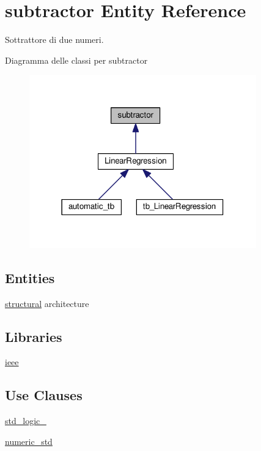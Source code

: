 \hypertarget{classsubtractor}{\section{subtractor Entity Reference}
\label{classsubtractor}
}


Sottrattore di due numeri.  




Diagramma delle classi per subtractor\nopagebreak
\begin{figure}[H]
\begin{center}
\leavevmode
\includegraphics[width=278pt]{classsubtractor__inherit__graph}
\end{center}
\end{figure}
\subsection*{Entities}
\begin{DoxyCompactItemize}
\item 
\hyperlink{classsubtractor_1_1structural}{structural} architecture
\end{DoxyCompactItemize}
\subsection*{Libraries}
 \begin{DoxyCompactItemize}
\item 
\hyperlink{group___subtractor_ga0a6af6eef40212dbaf130d57ce711256}{ieee} 
\end{DoxyCompactItemize}
\subsection*{Use Clauses}
 \begin{DoxyCompactItemize}
\item 
\hyperlink{group___subtractor_gacd03516902501cd1c7296a98e22c6fcb}{std\+\_\+logic\+\_}   
\item 
\hyperlink{group___subtractor_ga2edc34402b573437d5f25fa90ba4013e}{numeric\+\_\+std}   
\end{DoxyCompactItemize}
